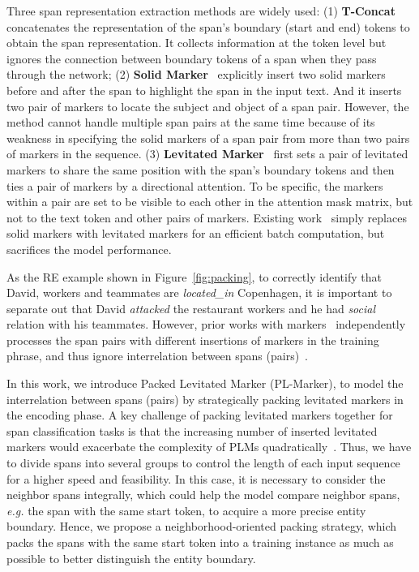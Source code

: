 \documentclass[11pt]{article}
\newcommand\Ourmodel{PL-Marker\xspace}
\begin{document}
Three span representation extraction methods are widely used: (1) \textbf{T-Concat}~\cite{e2ecoref,  Generalspan} concatenates the  representation of the span's boundary (start and end) tokens to obtain the span representation. It collects information at the token level but ignores the connection between boundary tokens of a span when they pass through the network;  
(2) \textbf{Solid Marker}~\cite{MTB,ChaojunXiao2020DenoisingRE} explicitly insert two solid markers  before and after the span to highlight the span in the input text. And it inserts two pair of markers to locate the subject and object of a span pair. However, the method cannot handle multiple span pairs at the same time because of its weakness in specifying the solid markers of a span pair from more than two pairs of markers in the sequence. 
(3) \textbf{Levitated Marker}~\cite{PURE} first sets a pair of levitated markers to share the same position with the span's boundary tokens and then  ties a pair of markers by a directional attention. To be specific, the markers within a pair are set to be visible to each other in the attention mask matrix, but not to the text token and other pairs of markers. Existing work~\cite{PURE} simply replaces solid markers with levitated markers for an efficient batch computation, but sacrifices the model performance. 






As the RE example shown in Figure~\ref{fig:packing}, to correctly identify that  David,  workers and teammates are \emph{located\_in} Copenhagen, it is important to separate out that David \emph{attacked} the  restaurant workers and he had \emph{social} relation with his teammates. However, prior works with markers~\cite{PURE} independently processes the span pairs with different insertions of markers in the training phrase, and thus ignore interrelation between spans (pairs)~\cite{ContextAware, DyGIE, DyGIEpp}. 














In this work, we introduce Packed Levitated Marker (\Ourmodel), to model the interrelation between spans (pairs) by strategically packing levitated markers in the encoding phase. 
A key challenge of packing levitated markers together for span classification tasks is that the increasing number of inserted levitated markers would exacerbate the complexity of PLMs quadratically~\cite{TR-BERT}. Thus, we have to  divide spans into several groups to control the length of each input sequence for a higher speed and feasibility. 
In this case, it is necessary to consider the neighbor spans integrally, which could help the model compare neighbor spans, \emph{e.g.} the span with the same start token, to acquire a more precise entity boundary. Hence, we propose a neighborhood-oriented packing strategy, which packs the spans with the same start token into a training instance as much as possible to better distinguish the entity boundary.  
\end{document}
